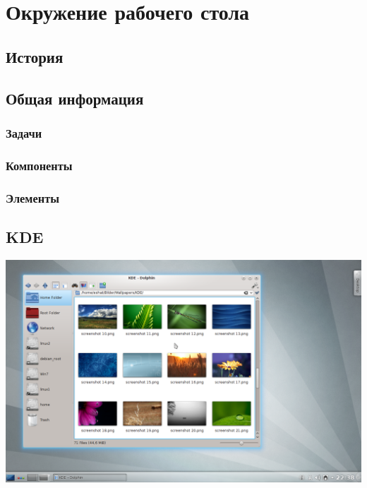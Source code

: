 \section{Окружение рабочего стола}\label{base:software:de}
\subsection{История}\label{base:software:de:history}
\subsection{Общая информация}\label{base:software:de:info}
\subsubsection{Задачи}\label{base:software:de:info:tasks}
\subsubsection{Компоненты}\label{base:software:de:info:components}
\subsubsection{Элементы}\label{base:software:de:info:elements}
\subsection{KDE}\label{base:software:de:kde}
\includegraphics[scale=0.38]{base/Software/KDE1.png}

